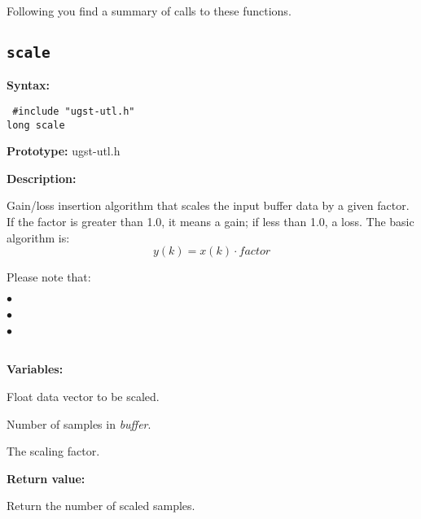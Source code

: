 Following you find a summary of calls to these functions.

\subsection{{\tt scale}}

{\bf Syntax: }

{\tt
\#include "ugst-utl.h"\\
long scale
}

{\bf Prototype: }    ugst-utl.h

{\bf Description: }

Gain/loss insertion algorithm that scales the input buffer data by a
given factor. If the factor is greater than 1.0, it means a gain; if
less than 1.0, a loss. The basic algorithm is:
\[
                              y(k)= x(k) \cdot factor
\]

        Please note that:

\begin{minipage}{140mm}
$\bullet$ 

$\bullet$ 

$\bullet$ 
\end{minipage}\\

{\bf Variables: }
\begin{Descr}{\DescrLen}
 \item[\pbox{20mm}{\em buffer}] %
               Float data vector to be scaled.
 \item[\pbox{20mm}{\em smpno}] %
               Number of samples in {\em buffer}.
 \item[\pbox{20mm}{\em factor}] %
               The \float scaling factor.
\end{Descr}

{\bf Return value: }

Return the number of scaled samples.


